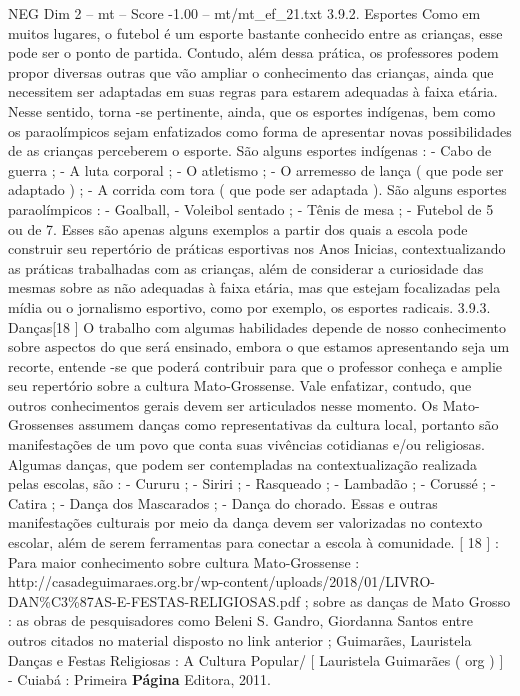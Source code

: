 \begin{textsample}{NEG Dim 2 – mt – Score -1.00 – mt/mt\_ef\_21.txt}  \label{ex:f2_neg_068}
3.9.2.
Esportes Como em muitos lugares, o futebol é um esporte bastante conhecido entre as crianças, esse pode ser o ponto de partida.
Contudo, além dessa prática, os professores podem propor diversas outras que vão ampliar o conhecimento das crianças, ainda que necessitem ser adaptadas em suas regras para estarem adequadas à faixa etária.
Nesse sentido, torna -se pertinente, ainda, que os esportes indígenas, bem como os paraolímpicos sejam enfatizados como forma de apresentar novas possibilidades de as crianças perceberem o esporte.
São alguns esportes indígenas : - Cabo de guerra ; - A luta corporal ; - O atletismo ; - O arremesso de lança ( que pode ser adaptado ) ; - A corrida com tora ( que pode ser adaptada ).
São alguns esportes paraolímpicos : - Goalball, - Voleibol sentado ; - Tênis de mesa ; - Futebol de 5 ou de 7.
Esses são apenas alguns exemplos a partir dos quais a escola pode construir seu repertório de práticas esportivas nos Anos Inicias, contextualizando as práticas trabalhadas com as crianças, além de considerar a curiosidade das mesmas sobre as não adequadas à faixa etária, mas que estejam focalizadas pela mídia ou o jornalismo esportivo, como por exemplo, os esportes radicais. 3.9.3.
Danças[18 ] O trabalho com algumas habilidades depende de nosso conhecimento sobre aspectos do que será ensinado, embora o que estamos apresentando seja um recorte, entende -se que poderá contribuir para que o professor conheça e amplie seu repertório sobre a cultura Mato-Grossense.
Vale enfatizar, contudo, que outros conhecimentos gerais devem ser articulados nesse momento.
Os Mato-Grossenses assumem danças como representativas da cultura local, portanto são manifestações de um povo que conta suas vivências cotidianas e/ou religiosas.
Algumas danças, que podem ser contempladas na contextualização realizada pelas escolas, são : - Cururu ; - Siriri ; - Rasqueado ; - Lambadão ; - Corussé ; - Catira ; - Dança dos Mascarados ; - Dança do chorado.
Essas e outras manifestações culturais por meio da dança devem ser valorizadas no contexto escolar, além de serem ferramentas para conectar a escola à comunidade. [ 18 ] : Para maior conhecimento sobre cultura Mato-Grossense : http://casadeguimaraes.org.br/wp-content/uploads/2018/01/LIVRO-DAN\%C3\%87AS-E-FESTAS-RELIGIOSAS.pdf ; sobre as danças de Mato Grosso : as obras de pesquisadores como Beleni S.
Gandro, Giordanna Santos entre outros citados no material disposto no link anterior ; Guimarães, Lauristela Danças e Festas Religiosas : A Cultura Popular/ [ Lauristela Guimarães ( org ) ] - Cuiabá : Primeira \textbf{Página} Editora, 2011.

\end{textsample}
